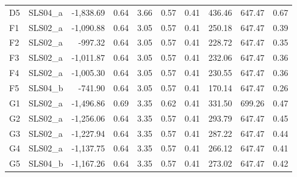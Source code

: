 \begin{center}
\begin{tabular}{|l|l|r|r|r|r|r|r|r|r|}
 D5 &  SLS04\_a & -1,838.69 & 0.64 & 3.66 & 0.57 & 0.41 & 436.46 & 647.47 & 0.67\\
 F1 &  SLS02\_a & -1,090.88 & 0.64 & 3.05 & 0.57 & 0.41 & 250.18 & 647.47 & 0.39\\
 F2 &  SLS02\_a & -997.32 & 0.64 & 3.05 & 0.57 & 0.41 & 228.72 & 647.47 & 0.35\\
 F3 &  SLS02\_a & -1,011.87 & 0.64 & 3.05 & 0.57 & 0.41 & 232.06 & 647.47 & 0.36\\
 F4 &  SLS02\_a & -1,005.30 & 0.64 & 3.05 & 0.57 & 0.41 & 230.55 & 647.47 & 0.36\\
 F5 &  SLS04\_b & -741.90 & 0.64 & 3.05 & 0.57 & 0.41 & 170.14 & 647.47 & 0.26\\
 G1 &  SLS02\_a & -1,496.86 & 0.69 & 3.35 & 0.62 & 0.41 & 331.50 & 699.26 & 0.47\\
 G2 &  SLS02\_a & -1,256.06 & 0.64 & 3.35 & 0.57 & 0.41 & 293.79 & 647.47 & 0.45\\
 G3 &  SLS02\_a & -1,227.94 & 0.64 & 3.35 & 0.57 & 0.41 & 287.22 & 647.47 & 0.44\\
 G4 &  SLS02\_a & -1,137.75 & 0.64 & 3.35 & 0.57 & 0.41 & 266.12 & 647.47 & 0.41\\
 G5 &  SLS04\_b & -1,167.26 & 0.64 & 3.35 & 0.57 & 0.41 & 273.02 & 647.47 & 0.42\\
\hline
  \end{tabular}
  \end{center}

